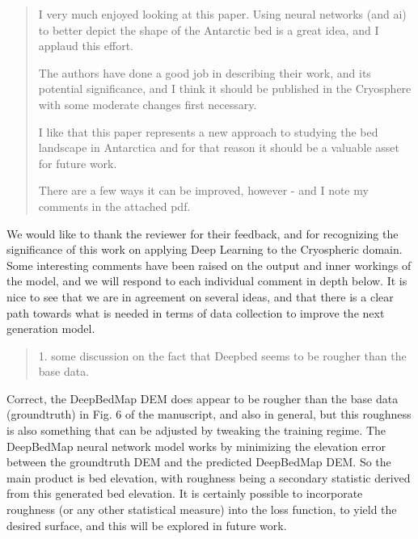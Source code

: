 %
%
%


\begin{quote}
\color{blue}
  I very much enjoyed looking at this paper.
  Using neural networks (and ai) to better depict the shape of the Antarctic bed is a great idea, and I applaud this effort.

  The authors have done a good job in describing their work, and its potential significance, and I think it should be published in the Cryosphere with some moderate changes first necessary.

  I like that this paper represents a new approach to studying the bed landscape in Antarctica and for that reason it should be a valuable asset for future work.

  There are a few ways it can be improved, however - and I note my comments in the attached pdf.
\end{quote}

We would like to thank the reviewer for their feedback, and for recognizing the significance of this work on applying Deep Learning to the Cryospheric domain.
Some interesting comments have been raised on the output and inner workings of the model, and we will respond to each individual comment in depth below.
It is nice to see that we are in agreement on several ideas, and that there is a clear path towards what is needed in terms of data collection to improve the next generation model.

\bigskip
{}

\begin{quote}
\color{blue}
  1. some discussion on the fact that Deepbed seems to be rougher than the base data.
\end{quote}

Correct, the DeepBedMap DEM does appear to be rougher than the base data (groundtruth) in Fig. 6 of the manuscript, and also in general, but this roughness is also something that can be adjusted by tweaking the training regime.
The DeepBedMap neural network model works by minimizing the elevation error between the groundtruth DEM and the predicted DeepBedMap DEM.
So the main product is bed elevation, with roughness being a secondary statistic derived from this generated bed elevation.
It is certainly possible to incorporate roughness (or any other statistical measure) into the loss function, to yield the desired surface, and this will be explored in future work.

